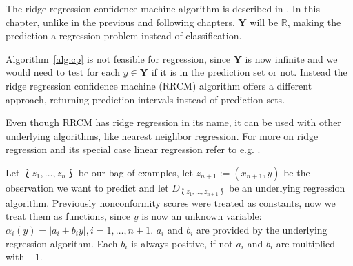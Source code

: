 \documentclass[twoside,11pt]{article}
\begin{document}
The ridge regression confidence machine algorithm is
described in
\citet[Chapter 2.3]{nouretdinov_et_al_2001, alrw}.
In this chapter, unlike in the previous and following
chapters, $\textbf{Y}$ will be $\mathbb{R}$, making the
prediction a regression problem instead of classification.

Algorithm~\ref{alg:cp} is not feasible for regression,
since $\textbf{Y}$ is now infinite and we would need to
test for each $y \in \textbf{Y}$ if it is in the prediction
set or not. Instead the ridge regression confidence machine
(RRCM) algorithm offers a different approach, returning
prediction intervals instead of prediction sets.

Even though RRCM has ridge regression in its name, it can
be used with other underlying algorithms, like nearest
neighbor regression. For more on ridge regression and its
special case linear regression refer to e.g.
\citet[Chapter 3]{elem_stat}.

Let $\Lbag z_1,\dots,z_n \Rbag$ be our bag of examples,
let $z_{n+1} := (x_{n+1}, y)$ be the observation we want to
predict and let $D_{\Lbag z_1,\dots,z_{n+1} \Rbag}$ be an
underlying regression algorithm.
Previously nonconformity scores were treated as constants,
now we treat them as functions, since $y$ is now an unknown
variable: $\alpha_i(y) = |a_i + b_i y|, i=1,\dots,n+1$.
$a_i$ and $b_i$ are provided by the underlying regression
algorithm. Each $b_i$ is always positive, if not $a_i$ and
$b_i$ are multiplied with $-1$.
\end{document}
